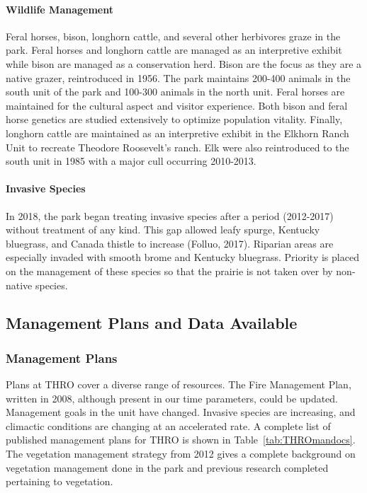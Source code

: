 \paragraph{Wildlife Management} 
Feral horses, bison, longhorn cattle, and several other herbivores graze in the park.
Feral horses and longhorn cattle are managed as an interpretive exhibit while bison are managed as a conservation herd. 
Bison are the focus as they are a native grazer, reintroduced in 1956. 
The park maintains 200-400 animals in the south unit of the park and 100-300 animals in the north unit. 
Feral horses are maintained for the cultural aspect and visitor experience. 
Both bison and feral horse genetics are studied extensively to optimize population vitality. 
Finally, longhorn cattle are maintained as an interpretive exhibit in the Elkhorn Ranch Unit to recreate Theodore Roosevelt's ranch. 
Elk were also reintroduced to the south unit in 1985 with a major cull occurring 2010-2013.

\paragraph{Invasive Species} 
In 2018, the park began treating invasive species after a period (2012-2017) without treatment of any kind. 
This gap allowed leafy spurge, Kentucky bluegrass, and Canada thistle to increase (Folluo, 2017). 
Riparian areas are especially invaded with smooth brome and Kentucky bluegrass. 
Priority is placed on the management of these species so that the prairie is not taken over by non-native species.

\subsection{Management Plans and Data Available}

\subsubsection{Management Plans}

Plans at THRO cover a diverse range of resources. 
The Fire Management Plan, written in 2008, although present in our time parameters, could be updated. 
Management goals in the unit have changed. 
Invasive species are increasing, and climactic conditions are changing at an accelerated rate. 
A complete list of published management plans for THRO is shown in Table~\ref{tab:THROmandocs}. 
The vegetation management strategy from 2012 gives a complete background on vegetation management done in the park and previous research completed pertaining to vegetation.

